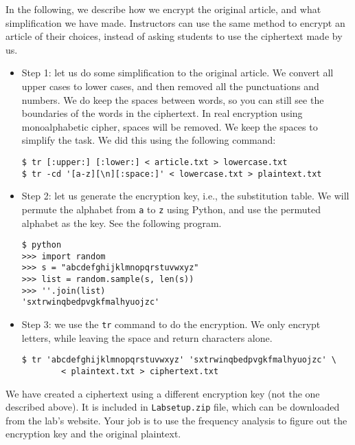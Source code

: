 In the following, we describe how we encrypt the original article, and what
simplification we have made. Instructors can use the same
method to encrypt an article of their choices, instead of asking
students to use the ciphertext made by us.

\begin{itemize}

\item Step 1: let us do some simplification to the original article.
We convert all upper cases to lower cases, and then
removed all the punctuations and numbers.  We do keep the spaces between words, so
you can still see the boundaries of the words in the ciphertext.
In real encryption using monoalphabetic cipher,
spaces will be removed. We keep the spaces to simplify the task. We did this using the
following command:

\begin{lstlisting}
$ tr [:upper:] [:lower:] < article.txt > lowercase.txt
$ tr -cd '[a-z][\n][:space:]' < lowercase.txt > plaintext.txt
\end{lstlisting}


\item Step 2: let us generate the encryption key, i.e., the substitution table.
We will permute the alphabet from \texttt{a}
to \texttt{z} using Python, and use the permuted alphabet as the key. See the following program.

\begin{lstlisting}
$ python
>>> import random
>>> s = "abcdefghijklmnopqrstuvwxyz"
>>> list = random.sample(s, len(s))
>>> ''.join(list)
'sxtrwinqbedpvgkfmalhyuojzc'
\end{lstlisting}


\item Step 3: we use the \texttt{tr} command to do the encryption.
We only encrypt letters, while leaving the space and return characters alone.


\begin{lstlisting}
$ tr 'abcdefghijklmnopqrstuvwxyz' 'sxtrwinqbedpvgkfmalhyuojzc' \
        < plaintext.txt > ciphertext.txt
\end{lstlisting}

\end{itemize}


We have created a ciphertext using a different encryption key (not the one described above).
It is included in \texttt{Labsetup.zip} file, which
can be downloaded from the lab's website. Your job is to use the frequency analysis
to figure out the encryption key and the original plaintext.



